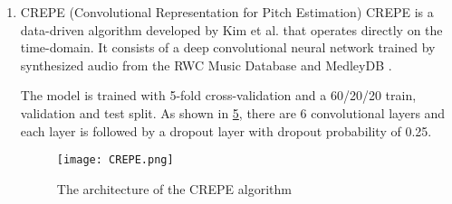 \begin{enumerate}
	\begin{figure}
		\centering
		\begin{subfigure}{.3\textwidth}
		  \centering
		  \texttt{[image: signalwaveform.png]}
		  \caption{Signal waveform}
		  \label{signal}
		\end{subfigure}%
		\begin{subfigure}{.3\textwidth}
			\centering
			\texttt{[image: acf.png]}
			\caption{$r_t(\tau)$ calculated from figure \ref{signal}  using normal ACF}
			\label{acf}
		  \end{subfigure}%
		\begin{subfigure}{.3\textwidth}
		  \centering
		  \texttt{[image: taperedacf.png]}
		  \caption{$r_t(\tau)$ calculated with the equation \ref{signal}}
		  \label{taped}
		\end{subfigure}%
		\label{YIN}
	\end{figure}
	
	We then select the highest peak by exhaustive search within an user-defined range of lags, the corresponding time lag will be
	the inverse of our estimated $f0$

	To improve the error rates and target periodicity, de Cheveigné & Kawahara introduced a cumulative mean normalized difference function (CMNDF)
	to replace ACF. 
	\[CMNDF(\tau) =  
	\begin{cases}
		1,              & \text{if } \tau \eq 0\\ 
    	\frac{DF(\tau)}{(1/\tau)\sum_{j=1}{\tau}DF(j)}, & \text{otherwise.} \\
	\end{cases}
	\]
	We then find $\tau$ that minimises $CMNDF(\tau)$ and the corresponding $f0$.

	\item CREPE (Convolutional Representation for Pitch Estimation)
	CREPE is a data-driven algorithm developed by Kim et al. that operates directly on the time-domain.
	It consists of a deep convolutional neural network trained by synthesized audio from the RWC Music Database \cite{rwcdb}
	and MedleyDB \cite{medleydb}. 

	The model is trained with 5-fold cross-validation and a 60/20/20 train, validation and test split.
	As shown in \ref{CREPE}, there are 6 convolutional layers and each layer is followed by a dropout layer with dropout probability of 0.25. 

	\begin{figure}
		\texttt{[image: CREPE.png]}
		\caption{The architecture of the CREPE algorithm \cite{CREPE}}
		\label{CREPE}
	\end{figure}

\end{enumerate}

